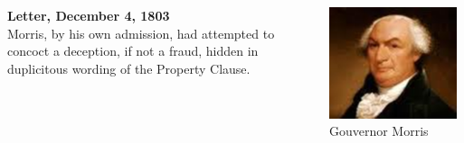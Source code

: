 \begin{frame}
    \begin{columns}[onlytextwidth]
            \textbf{Letter, December 4, 1803} \\
            Morris, by his own admission, had attempted to concoct a deception,
            if not a fraud, hidden in duplicitous wording of the Property
            Clause.

            \centering
            \includegraphics[width=0.95\textwidth]{img/morris-portrait.png} \\
            Gouvernor Morris \\
    \end{columns}
\end{frame}

